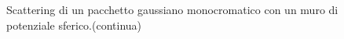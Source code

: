 \begin{figure}[h]
 \centering
 \caption{Scattering di un pacchetto gaussiano monocromatico con un muro di potenziale sferico.(continua)} 
 \end{figure}
